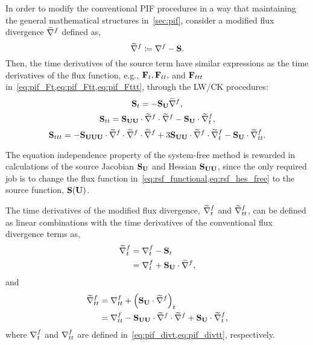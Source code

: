 In order to modify the conventional PIF procedures
in a way that maintaining the general mathematical structures
in~\cref{sec:pif}, consider a modified flux divergence \( \widetilde{\nabla}^{f} \) defined as,
\begin{equation}\label{eq:sf_source_divs}
    \widetilde{\nabla}^{f} \coloneqq \nabla^{f} - \mathbf{S}.
\end{equation}
Then, the time derivatives of the source term have similar expressions
as the time derivatives of the flux function,
e.g., \( \mathbf{F}_{t}, \mathbf{F}_{tt}, \) and \( \mathbf{F}_{ttt} \) in~\cref{eq:pif_Ft,eq:pif_Ftt,eq:pif_Fttt},
through the LW/CK procedures:
\begin{equation}\label{eq:sf_source_St}
    \mathbf{S}_{t} = -\mathbf{S}_{\mathbf{U}} \widetilde{\nabla}^{f},
\end{equation}
\begin{equation}\label{eq:sf_source_Stt}
    \mathbf{S}_{tt} = \mathbf{S}_{\mathbf{U} \mathbf{U}} \cdot \widetilde{\nabla}^{f} \cdot \widetilde{\nabla}^{f} - \mathbf{S}_{\mathbf{U}} \cdot \widetilde{\nabla}^{f}_{t},
\end{equation}
\begin{equation}\label{eq:sf_source_Sttt}
    \mathbf{S}_{ttt} = -\mathbf{S}_{\mathbf{U} \mathbf{U} \mathbf{U}} \cdot \widetilde{\nabla}^{f} \cdot \widetilde{\nabla}^{f} \cdot \widetilde{\nabla}^{f}
    + 3 \mathbf{S}_{\mathbf{U} \mathbf{U}} \cdot \widetilde{\nabla}^{f} \cdot \widetilde{\nabla}^{f}_{t}
    - \mathbf{S}_{\mathbf{U}} \cdot \widetilde{\nabla}^{f}_{tt}.
\end{equation}

The equation independence property of the system-free method
is rewarded in calculations of the source Jacobian \( \mathbf{S}_{\mathbf{U}} \) and Hessian \( \mathbf{S}_{\mathbf{U}\mathbf{U}} \),
since the only required job is to change the flux function
in~\cref{eq:rsf_functional,eq:rsf_hes_free} to the source function, \( \mathbf{S}(\mathbf{U}) \).

The time derivatives of the modified flux divergence, \( \widetilde{\nabla}^{f}_{t} \) and \( \widetilde{\nabla}^{f}_{tt} \),
can be defined as linear combinations with the time derivatives of the conventional
flux divergence terms as,
\begin{equation}\label{eq:sf_source_divst}
    \begin{split}
        \widetilde{\nabla}^{f}_{t} &= \nabla^{f}_{t} - \mathbf{S}_{t} \\
                  &= \nabla^{f}_{t} + \mathbf{S}_{\mathbf{U}} \cdot \widetilde{\nabla}^{f},
    \end{split}
\end{equation}
and
\begin{equation}\label{eq:sf_source_divstt}
    \begin{split}
        \widetilde{\nabla}^{f}_{tt} &= \nabla^{f}_{tt} + \left( \mathbf{S}_{\mathbf{U}} \cdot \widetilde{\nabla}^{f} \right)_{t} \\
                   &= \nabla^{f}_{tt} - \mathbf{S}_{\mathbf{U}\mathbf{U}} \cdot \widetilde{\nabla}^{f} \cdot \widetilde{\nabla}^{f} + \mathbf{S}_{\mathbf{U}} \cdot \widetilde{\nabla}^{f}_{t},
    \end{split}
\end{equation}
where \( \nabla^{f}_{t} \) and \( \nabla^{f}_{tt} \) are defined in~\cref{eq:pif_divt,eq:pif_divtt}, respectively.


